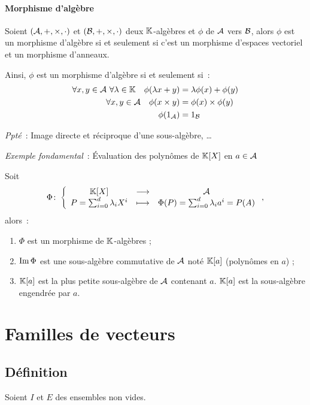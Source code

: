 \paragraph{Morphisme d'algèbre}
\begin{defdef}
	Soient  $(\mathcal{A},+,\times,\cdot)$ et $(\mathcal{B},+,\times,\cdot)$ deux $\mathbb{K}$-algèbres et $\phi$ de $\mathcal{A}$ vers $\mathcal{B}$, alors $\phi$ est un morphisme d'algèbre si et seulement si c'est un morphisme d'espaces vectoriel et un morphisme d'anneaux.
\end{defdef}
Ainsi, $\phi$ est un morphisme d'algèbre si et seulement si~:
\begin{align}
	\forall x,y \in \mathcal{A} \ \forall \lambda \in \mathbb{K} \quad \phi(\lambda x+y) &= \lambda\phi(x)+\phi(y) \\
	\forall x,y \in \mathcal{A} \quad \phi(x \times y) &= \phi(x) \times \phi(y) \\
	\phi(1_{\mathcal{A}}) &= 1_{\mathcal{B}}
\end{align}

\emph{Ppté}~: Image directe et réciproque d'une sous-algèbre, \ldots

\emph{Exemple fondamental}~: Évaluation des polynômes de $\mathbb{K}[X]$ en $a \in \mathcal{A}$
\begin{prop}
	Soit 
	\begin{equation}
		\Phi\colon \left\{\begin{array}{ccc} \mathbb{K}[X] & \longrightarrow &\mathcal{A}\\ P = \sum_{i=0}^d \lambda_i X^i & \longmapsto & \Phi(P) = \sum_{i=0}^d\lambda_i a^i=P(A) \end{array} \right.,
	\end{equation} 
	alors~:
	\begin{enumerate}
		\item $\Phi$ est un morphisme de $\mathbb{K}$-algèbres ;
		\item $\operatorname{Im}{\Phi}$ est une sous-algèbre commutative de $\mathcal{A}$ noté $\mathbb{K}[a]$ (polynômes en $a$) ;
		\item $\mathbb{K}[a]$ est la plus petite sous-algèbre de $\mathcal{A}$ contenant $a$. $\mathbb{K}[a]$ est la sous-algèbre engendrée par $a$.
	\end{enumerate}
\end{prop}

\section{Familles de vecteurs}
\subsection{Définition}
Soient $I$ et $E$ des ensembles non vides.
